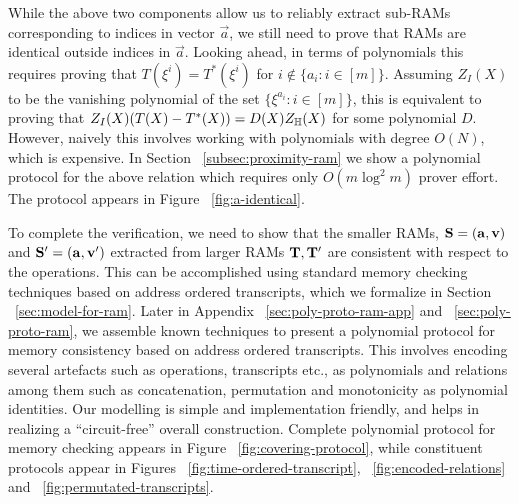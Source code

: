 \smallskip

 While the above two components allow us to reliably extract sub-RAMs
corresponding to indices in vector $\vec{a}$, we still need to prove that RAMs are identical outside indices in
$\vec{a}$. Looking ahead, in terms of polynomials this requires proving that $T(\xi^i)=T^*(\xi^i)$ for $i\not\in
\{a_i:i\in [m]\}$. Assuming $Z_I(X)$ to be the vanishing polynomial of the set $\{\xi^{a_i}:i\in [m]\}$,
this is equivalent to proving that $Z_I(X)(T(X) - T^*(X)) = D(X)Z_\mathbb{H}(X)$ for some polynomial $D$. However, naively
this involves working with polynomials with degree $O(N)$, which is expensive.
In Section ~\ref{subsec:proximity-ram} we show a polynomial protocol for the above relation which requires only $O(m\log^2 m)$ prover effort. The protocol
appears in Figure ~\ref{fig:a-identical}.

\smallskip

 To complete the verification, we need to show that
the smaller RAMs, $\mathbf{S}=(\mathbf{a},\mathbf{v})$ and $\mathbf{S}'=(\mathbf{a},\mathbf{v}')$ extracted from larger RAMs $\mathbf{T},\mathbf{T}'$
are consistent with respect to the operations. This can be accomplished using standard memory checking techniques
based on address ordered transcripts, which we formalize in Section ~\ref{sec:model-for-ram}. Later in
Appendix ~\ref{sec:poly-proto-ram-app} and ~\ref{sec:poly-proto-ram}, we assemble known techniques to present
a polynomial protocol for memory consistency based on address ordered transcripts.
This involves encoding several artefacts such as operations, transcripts etc., as polynomials and relations
among them such as concatenation, permutation and monotonicity as polynomial identities. Our modelling is
simple and implementation friendly, and helps in realizing a ``circuit-free'' overall construction. Complete
polynomial protocol for memory checking appears in Figure ~\ref{fig:covering-protocol}, while constituent protocols
appear in Figures ~\ref{fig:time-ordered-transcript}, ~\ref{fig:encoded-relations} and ~\ref{fig:permutated-transcripts}.

\smallskip


